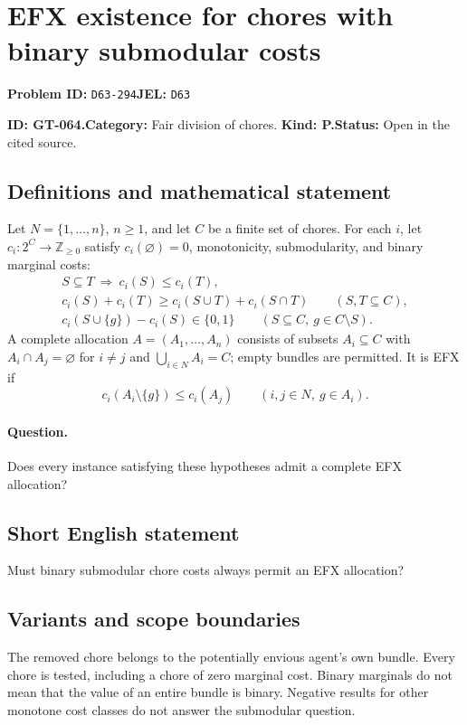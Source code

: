 \documentclass[11pt,a4paper]{article}
\begin{document}
\section*{EFX existence for chores with binary submodular costs}
\textbf{Problem ID:} \texttt{D63-294}\quad \textbf{JEL:} \texttt{D63}\par
\label{problem:OP-0194}
\label{game:GT-064}
{\sffamily\small\color{muted}
\noindent\textbf{ID: GT-064.}\quad\textbf{Category:} Fair division of chores.
\quad\textbf{Kind: P.}\quad\textbf{Status:} Open in the cited source.
\par}
\subsection*{Definitions and mathematical statement}
Let \(N=\{1,\ldots,n\}\), \(n\geq 1\), and let \(C\) be a finite set
of chores. For each \(i\), let
\(c_i:2^C\to\mathbb Z_{\geq 0}\) satisfy \(c_i(\varnothing)=0\),
monotonicity, submodularity, and binary marginal costs:
\[
 \begin{gathered}
 S\subseteq T\ \Longrightarrow\ c_i(S)\leq c_i(T),\\
 c_i(S)+c_i(T)\geq c_i(S\cup T)+c_i(S\cap T)
 \qquad(S,T\subseteq C),\\
 c_i(S\cup\{g\})-c_i(S)\in\{0,1\}
 \qquad(S\subseteq C,\ g\in C\setminus S).
 \end{gathered}
\]
A complete allocation \(A=(A_1,\ldots,A_n)\) consists of subsets
\(A_i\subseteq C\) with \(A_i\cap A_j=\varnothing\) for \(i\ne j\)
and \(\bigcup_{i\in N}A_i=C\); empty bundles are permitted. It is EFX if
\[
 c_i(A_i\setminus\{g\})\leq c_i(A_j)
 \qquad(i,j\in N,\ g\in A_i).
\]

\paragraph{Question.}
Does every instance satisfying these hypotheses admit a complete EFX
allocation?

\subsection*{Short English statement}
Must binary submodular chore costs always permit an EFX allocation?

\subsection*{Variants and scope boundaries}
The removed chore belongs to the potentially envious agent's own bundle.
Every chore is tested, including a chore of zero marginal cost.
Binary marginals do not mean that the value of an entire bundle is binary.
Negative results for other monotone cost classes do not answer the
submodular question.
\end{document}

